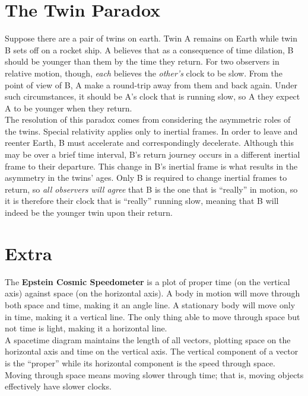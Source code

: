 \documentclass{subfiles}
\begin{document}
	\section{The Twin Paradox}
		Suppose there are a pair of twins on earth. Twin A remains on Earth while twin B sets off on a rocket ship. A believes that as a consequence of time dilation, B should be younger than them by the time they return. For two observers in relative motion, though, \textit{each} believes the \textit{other's} clock to be slow. From the point of view of B, A make a round-trip away from them and back again. Under such circumstances, it should be A's clock that is running slow, so A they expect A to be younger when they return. \\
			The resolution of this paradox comes from considering the asymmetric roles of the twins. Special relativity applies only to inertial frames. In order to leave and reenter Earth, B must accelerate and correspondingly decelerate. Although this may be over a brief time interval, B's return journey occurs in a different inertial frame to their departure. This change in B's inertial frame is what results in the asymmetry in the twins' ages. Only B is required to change inertial frames to return, so \textit{all observers will agree} that B is the one that is \enquote{really} in motion, so it is therefore their clock that is \enquote{really} running slow, meaning that B will indeed be the younger twin upon their return.
	\section{Extra}
		The \textbf{Epstein Cosmic Speedometer} is a plot of proper time (on the vertical axis) against space (on the horizontal axis). A body in motion will move through both space and time, making it an angle line. A stationary body will move only in time, making it  a vertical line. The only thing able to move through space but not time is light, making it a horizontal line. \\
		A spacetime diagram maintains the length of all vectors, plotting space on the horizontal axis and time on the vertical axis. The vertical component of a vector is the \enquote{proper} while its horizontal component is the speed through space. \\
		Moving through space means moving slower through time; that is, moving objects effectively have slower clocks.
\end{document}
